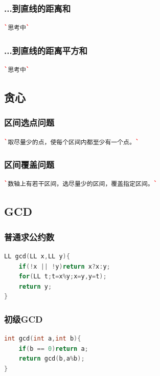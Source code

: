 \documentclass[a4paper]{article}
\begin{document}
\begin{CJK*}{UTF8}{gbsn}
\begin{multicols}{3}
\begin{flushleft}
\subsubsection{...到直线的距离和}
\begin{lstlisting}[language={c++}]
`思考中`
\end{lstlisting}


\subsubsection{...到直线的距离平方和}
\begin{lstlisting}[language={c++}]
`思考中`
\end{lstlisting}



\subsection{贪心}

\subsubsection{区间选点问题}
\begin{lstlisting}[language={c++}]
`取尽量少的点，使每个区间内都至少有一个点。`
\end{lstlisting}

\subsubsection{区间覆盖问题}
\begin{lstlisting}[language={c++}]
`数轴上有若干区间，选尽量少的区间，覆盖指定区间。`
\end{lstlisting}



\subsection{GCD}


\subsubsection{普通求公约数}
\begin{lstlisting}[language={c++}]
LL gcd(LL x,LL y){
	if(!x || !y)return x?x:y;
	for(LL t;t=x%y;x=y,y=t);
	return y;
}
\end{lstlisting}

\subsubsection{初级GCD}
\begin{lstlisting}[language={c++}]
int gcd(int a,int b){
    if(b == 0)return a;
    return gcd(b,a%b);
}
\end{lstlisting}


\end{flushleft}
\end{multicols}
\end{CJK*}
\end{document}
